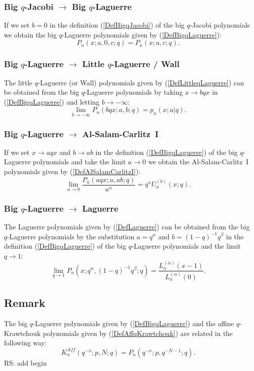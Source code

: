 \documentclass[envcountchap,graybox]{svmono}
\newcounter{rom}
\begin{document}
\subsubsection*{Big $q$-Jacobi $\rightarrow$ Big $q$-Laguerre}
If we set $b=0$ in the definition (\ref{DefBigqJacobi}) of
the big $q$-Jacobi polynomials we obtain the big $q$-Laguerre
polynomials given by (\ref{DefBigqLaguerre}):
$$P_n(x;a,0,c;q)=P_n(x;a,c;q).$$

\subsubsection*{Big $q$-Laguerre $\rightarrow$ Little $q$-Laguerre / Wall}
The little $q$-Laguerre (or Wall) polynomials given by (\ref{DefLittleqLaguerre})
can be obtained from the big $q$-Laguerre polynomials by taking $x\rightarrow bqx$
in (\ref{DefBigqLaguerre}) and letting $b\rightarrow -\infty$:
\begin{equation}
\lim_{b\rightarrow -\infty}P_n(bqx;a,b;q)=p_n(x;a|q).
\end{equation}

\subsubsection*{Big $q$-Laguerre $\rightarrow$ Al-Salam-Carlitz~I}
If we set $x\rightarrow aqx$ and $b\rightarrow ab$ in the definition
(\ref{DefBigqLaguerre}) of the big $q$-Laguerre polynomials and take the
limit $a\rightarrow 0$ we obtain the Al-Salam-Carlitz~I polynomials given by
(\ref{DefAlSalamCarlitzI}):
\begin{equation}
\lim_{a\rightarrow 0}\frac{P_n(aqx;a,ab;q)}{a^n}=q^nU_n^{(b)}(x;q).
\end{equation}

\subsubsection*{Big $q$-Laguerre $\rightarrow$ Laguerre}
The Laguerre polynomials given by (\ref{DefLaguerre}) can be obtained
from the big $q$-Laguerre polynomials by the substitution $a=q^{\alpha}$ and
$b=(1-q)^{-1}q^{\beta}$ in the definition (\ref{DefBigqLaguerre}) of the big
$q$-Laguerre polynomials and the limit $q\rightarrow 1$:
\begin{equation}
\lim_{q\rightarrow 1}P_n(x;q^{\alpha},(1-q)^{-1}q^{\beta};q)=
\frac{L_n^{(\alpha)}(x-1)}{L_n^{(\alpha)}(0)}.
\end{equation}

\subsection*{Remark}
The big $q$-Laguerre polynomials given by (\ref{DefBigqLaguerre}) and the
affine $q$-Krawtchouk polynomials given by (\ref{DefAffqKrawtchouk}) are
related in the following way:
$$K_n^{Aff}(q^{-x};p,N;q)=P_n(q^{-x};p,q^{-N-1};q).$$
 RS: add begin\label{sec14.10.1}
\end{document}
